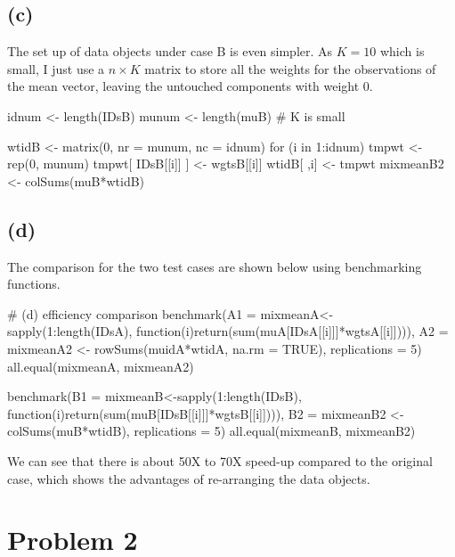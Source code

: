 \documentclass{article}
\begin{document}
\subsection*{(c)}
The set up of data objects under case B is even simpler. As $K=10$ which is small, I just use a $n \times K$ matrix to
store all the weights for the observations of the mean vector, leaving the untouched components with weight 0.

idnum <- length(IDsB)
munum <- length(muB) # K is small

wtidB <- matrix(0, nr = munum, nc = idnum)
for (i in 1:idnum) {
	tmpwt <- rep(0, munum)
	tmpwt[ IDsB[[i]] ] <- wgtsB[[i]]
	wtidB[ ,i] <- tmpwt
}
mixmeanB2 <- colSums(muB*wtidB)

\subsection*{(d)}
The comparison for the two test cases are shown below using benchmarking functions.

# (d) efficiency comparison
benchmark(A1 = {mixmeanA<-sapply(1:length(IDsA), function(i){return(sum(muA[IDsA[[i]]]*wgtsA[[i]]))})},
          A2 = {mixmeanA2 <- rowSums(muidA*wtidA, na.rm = TRUE)}, replications = 5)
all.equal(mixmeanA, mixmeanA2)

benchmark(B1 = {mixmeanB<-sapply(1:length(IDsB), function(i){return(sum(muB[IDsB[[i]]]*wgtsB[[i]]))})},
          B2 = {mixmeanB2 <- colSums(muB*wtidB)}, replications = 5)
all.equal(mixmeanB, mixmeanB2)

We can see that there is about 50X to 70X speed-up compared to the original case, which shows the 
advantages of re-arranging the data objects.

\newpage
\section*{Problem 2}
\end{document}
